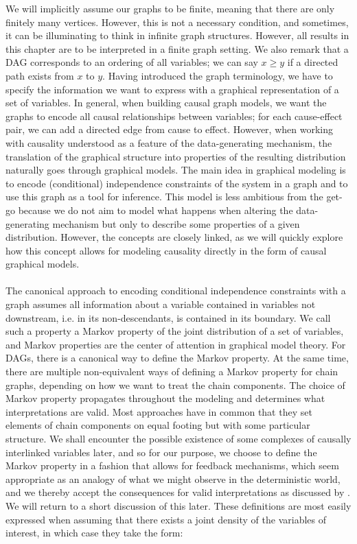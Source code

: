 \documentclass[11pt, a4paper]{memoir}
\theoremstyle{break}
\theoremstyle{break}
\theoremstyle{nonumberplain}
\begin{document}
We will implicitly assume our graphs to be finite, meaning that there are only finitely many vertices. However, this is not a necessary condition, and sometimes, it can be illuminating to think in infinite graph structures. However, all results in this chapter are to be interpreted in a finite graph setting. We also remark that a DAG corresponds to an ordering of all variables; we can say $x\geqslant y$ if a directed path exists from $x$ to $y$. Having introduced the graph terminology, we have to specify the information we want to express with a graphical representation of a set of variables. In general, when building causal graph models, we want the graphs to encode all causal relationships between variables; for each cause-effect pair, we can add a directed edge from cause to effect. However, when working with causality understood as a feature of the data-generating mechanism, the translation of the graphical structure into properties of the resulting distribution naturally goes through graphical models. The main idea in graphical modeling is to encode (conditional) independence constraints of the system in a graph and to use this graph as a tool for inference. This model is less ambitious from the get-go because we do not aim to model what happens when altering the data-generating mechanism but only to describe some properties of a given distribution. However, the concepts are closely linked, as we will quickly explore how this concept allows for modeling causality directly in the form of causal graphical models.\\\\
The canonical approach to encoding conditional independence constraints with a graph assumes all information about a variable contained in variables not downstream, i.e. in its non-descendants, is contained in its boundary. We call such a property a Markov property of the joint distribution of a set of variables, and Markov properties are the center of attention in graphical model theory. For DAGs, there is a canonical way to define the Markov property. At the same time, there are multiple non-equivalent ways of defining a Markov property for chain graphs, depending on how we want to treat the chain components. The choice of Markov property propagates throughout the modeling and determines what interpretations are valid. Most approaches have in common that they set elements of chain components on equal footing but with some particular structure. We shall encounter the possible existence of some complexes of causally interlinked variables later, and so for our purpose, we choose to define the Markov property in a fashion that allows for feedback mechanisms, which seem appropriate as an analogy of what we might observe in the deterministic world, and we thereby accept the consequences for valid interpretations as discussed by \cite{ChainGraph}. We will return to a short discussion of this later. These definitions are most easily expressed when assuming that there exists a joint density of the variables of interest, in which case they take the form:
\end{document}
